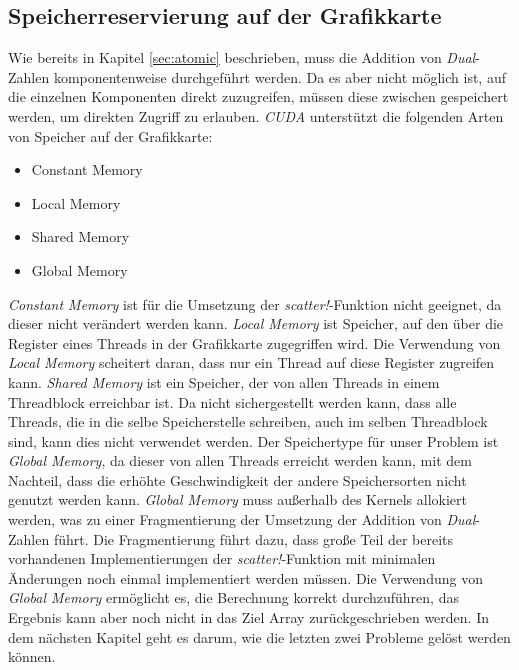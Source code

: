 \subsection{Speicherreservierung auf der Grafikkarte} \label{sec:memory}

Wie bereits in Kapitel \ref{sec:atomic} beschrieben, 
muss die Addition von \textit{Dual}-Zahlen komponentenweise durchgeführt werden.
Da es aber nicht möglich ist, auf die einzelnen Komponenten direkt zuzugreifen,
müssen diese zwischen gespeichert werden, um direkten Zugriff zu erlauben.
\textit{CUDA} \cite{besard2018juliagpu} unterstützt die folgenden Arten von Speicher auf der Grafikkarte:

\begin{itemize}
	\item Constant Memory
	\item Local Memory
	\item Shared Memory
	\item Global Memory
\end{itemize}

\textit{Constant Memory} ist für die Umsetzung der \textit{scatter!}-Funktion nicht geeignet,
da dieser nicht verändert werden kann.
\textit{Local Memory} ist Speicher, 
auf den über die Register eines Threads in der Grafikkarte zugegriffen wird.
Die Verwendung von \textit{Local Memory} scheitert daran, 
dass nur ein Thread auf diese Register zugreifen kann.
\textit{Shared Memory} ist ein Speicher, 
der von allen Threads in einem Threadblock erreichbar ist.
Da nicht sichergestellt werden kann, dass alle Threads, 
die in die selbe Speicherstelle schreiben, auch im selben Threadblock sind,
kann dies nicht verwendet werden.
Der Speichertype für unser Problem ist \textit{Global Memory}, 
da dieser von allen Threads erreicht werden kann,
mit dem Nachteil, dass die erhöhte Geschwindigkeit der andere Speichersorten
nicht genutzt werden kann.
\textit{Global Memory} muss außerhalb des Kernels allokiert werden, 
was zu einer Fragmentierung der Umsetzung der Addition von \textit{Dual}-Zahlen führt.
Die Fragmentierung führt dazu, 
dass große Teil der bereits vorhandenen Implementierungen der \textit{scatter!}-Funktion mit minimalen Änderungen noch einmal
implementiert werden müssen.
Die Verwendung von \textit{Global Memory} ermöglicht es, die Berechnung korrekt durchzuführen,
das Ergebnis kann aber noch nicht in das Ziel Array zurückgeschrieben werden.
In dem nächsten Kapitel geht es darum, wie die letzten zwei Probleme gelöst werden können.
